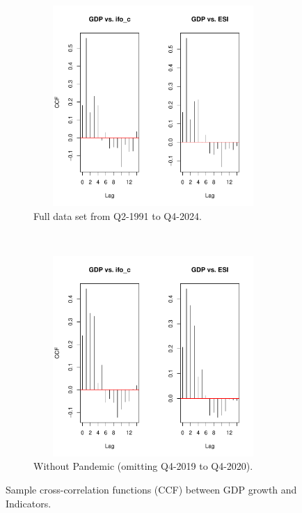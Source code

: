 \documentclass[11pt,a4paper]{article}
\begin{document}
\begin{figure}[ht]
  \begin{subfigure}[htpb]{\textwidth}
        \begin{center}
            \includegraphics[height=3in, width=4.5in]{./Figures/CCF.pdf}
            \caption{Full data set from Q2-1991 to Q4-2024.\label{fig:CCF}}
        \end{center}
    \end{subfigure}
    \\
    \begin{subfigure}[htpb]{\textwidth}
        \begin{center}
            \includegraphics[height=3in, width=4.5in]{./Figures/CCF_wc.pdf}
            \caption{Without Pandemic (omitting Q4-2019 to Q4-2020).\label{fig:CCF_wc}}
        \end{center}
    \end{subfigure}
    \caption{Sample cross-correlation functions (CCF) between GDP growth and Indicators.}
\end{figure}
\end{document}
